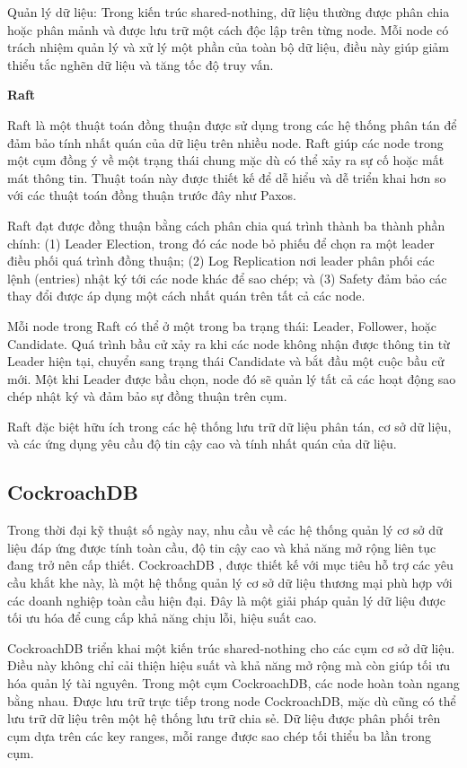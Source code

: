 \documentclass{article}[14pt]
\begin{document}
Quản lý dữ liệu: Trong kiến trúc shared-nothing, dữ liệu thường được phân chia hoặc phân mảnh và được lưu trữ một cách độc lập trên từng node. Mỗi node có trách nhiệm quản lý và xử lý một phần của toàn bộ dữ liệu, điều này giúp giảm thiểu tắc nghẽn dữ liệu và tăng tốc độ truy vấn.

\textbf{Raft}

Raft \cite{ongaro2014raft} là một thuật toán đồng thuận được sử dụng trong các hệ thống phân tán để đảm bảo tính nhất quán của dữ liệu trên nhiều node. Raft giúp các node trong một cụm đồng ý về một trạng thái chung mặc dù có thể xảy ra sự cố hoặc mất mát thông tin. Thuật toán này được thiết kế để dễ hiểu và dễ triển khai hơn so với các thuật toán đồng thuận trước đây như Paxos.

Raft đạt được đồng thuận bằng cách phân chia quá trình thành ba thành phần chính: (1) Leader Election, trong đó các node bỏ phiếu để chọn ra một leader điều phối quá trình đồng thuận; (2) Log Replication nơi leader phân phối các lệnh (entries) nhật ký tới các node khác để sao chép; và (3) Safety đảm bảo các thay đổi được áp dụng một cách nhất quán trên tất cả các node.

Mỗi node trong Raft có thể ở một trong ba trạng thái: Leader, Follower, hoặc Candidate. Quá trình bầu cử xảy ra khi các node không nhận được thông tin từ Leader hiện tại, chuyển sang trạng thái Candidate và bắt đầu một cuộc bầu cử mới. Một khi Leader được bầu chọn, node đó sẽ quản lý tất cả các hoạt động sao chép nhật ký và đảm bảo sự đồng thuận trên cụm.

Raft đặc biệt hữu ích trong các hệ thống lưu trữ dữ liệu phân tán, cơ sở dữ liệu, và các ứng dụng yêu cầu độ tin cậy cao và tính nhất quán của dữ liệu.



\subsection{CockroachDB}

Trong thời đại kỹ thuật số ngày nay, nhu cầu về các hệ thống quản lý cơ sở dữ liệu đáp ứng được tính toàn cầu, độ tin cậy cao và khả năng mở rộng liên tục đang trở nên cấp thiết. CockroachDB \cite{taft2020cockroachdb}, được thiết kế với mục tiêu hỗ trợ các yêu cầu khắt khe này, là một hệ thống quản lý cơ sở dữ liệu thương mại phù hợp với các doanh nghiệp toàn cầu hiện đại. Đây là một giải pháp quản lý dữ liệu được tối ưu hóa để cung cấp khả năng chịu lỗi, hiệu suất cao.

CockroachDB triển khai một kiến trúc shared-nothing cho các cụm cơ sở dữ liệu. Điều này không chỉ cải thiện hiệu suất và khả năng mở rộng mà còn giúp tối ưu hóa quản lý tài nguyên. Trong một cụm CockroachDB, các node hoàn toàn ngang bằng nhau. Được lưu trữ trực tiếp trong node CockroachDB, mặc dù cũng có thể lưu trữ dữ liệu trên một hệ thống lưu trữ chia sẻ. Dữ liệu được phân phối trên cụm dựa trên các key ranges, mỗi range được sao chép tối thiểu ba lần trong cụm.
\end{document}

